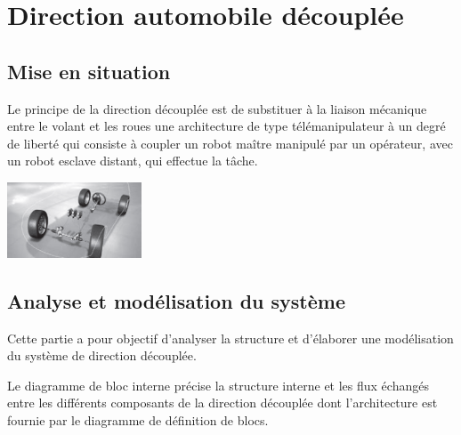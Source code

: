\documentclass[10pt,fleqn]{article} %
\begin{document}
\ifprof
\begin{corrige}

\end{corrige}
\else
\fi


\section{Direction automobile découplée}

\subsection{Mise en situation}

\noindent\begin{minipage}[c]{.67\linewidth}
\indent Le principe de la direction découplée est de substituer à la liaison mécanique entre le volant et les roues une architecture de type télémanipulateur à un degré de liberté qui consiste à coupler un robot maître manipulé par un opérateur, avec un robot esclave distant, qui effectue la tâche. 
\end{minipage}\hfill
\begin{minipage}[c]{.3\linewidth}
\begin{center}
\includegraphics[width=4cm]{images/img_01}
\end{center}
\end{minipage}

\subsection{Analyse et modélisation du système}
\begin{obj}
Cette partie a pour objectif d'analyser la structure et d'élaborer une modélisation du système
de direction découplée.
\end{obj}
Le diagramme de bloc interne précise la structure interne et les flux échangés
entre les différents composants de la direction découplée dont l'architecture est fournie par le
diagramme de définition de blocs.
\end{document}
